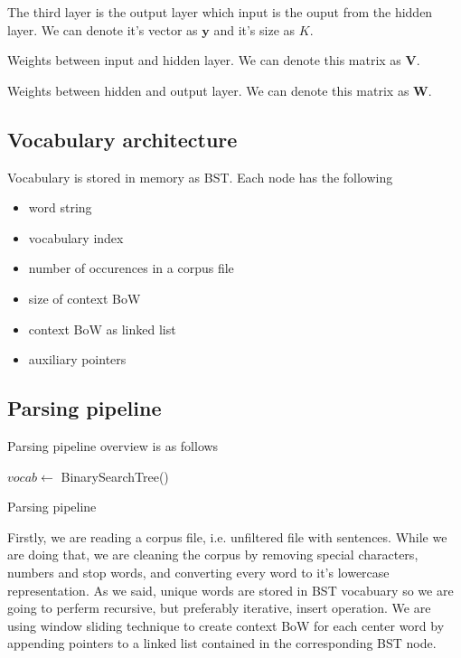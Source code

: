 \documentclass{article}
\newcommand{\SetAlgoStyle}{
	\SetAlgoNoLine
	\SetAlgoNoEnd
	\DontPrintSemicolon
}
\begin{document}
\medbreak

The third layer is the output layer which input is the ouput from the hidden
layer.
We can denote it's vector as $\boldsymbol{y}$ and it's size as $K$.

\medbreak

Weights between input and hidden layer. We can denote this matrix as $\boldsymbol{V}$.

\medbreak

Weights between hidden and output layer. We can denote this matrix as $\boldsymbol{W}$.

\subsection{Vocabulary architecture}

Vocabulary is stored in memory as BST. Each node has the following

\begin{itemize}
	\item word string
	\item vocabulary index
	\item number of occurences in a corpus file
	\item size of context BoW
	\item context BoW as linked list
	\item auxiliary pointers
\end{itemize}

\subsection{Parsing pipeline}

Parsing pipeline overview is as follows

\begin{algorithm}[H]
	\SetAlgoStyle
	$vocab \gets$ BinarySearchTree()\;
	\caption{Parsing pipeline}
\end{algorithm}

Firstly, we are reading a corpus file, i.e. unfiltered file with sentences.
While we are doing that, we are cleaning the corpus by removing special
characters, numbers and stop words, and converting every word to it's
lowercase representation. As we said, unique words are stored in BST
vocabuary so we are going to perferm recursive, but preferably iterative,
insert operation. We are using window sliding technique to create context BoW 
for each center word by appending pointers to a linked list contained in the
corresponding BST node.
\end{document}
